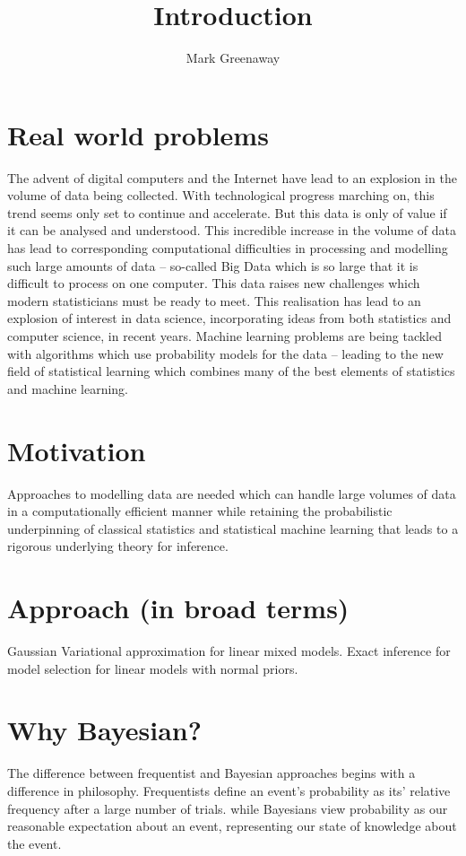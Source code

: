 \documentclass{amsart}[12pt]
\title{Introduction}
\author{Mark Greenaway}
\begin{document}
\setlength{\parindent}{0pt}
\maketitle

\section{Real world problems}
The advent of digital computers and the Internet have lead to an explosion in the volume of data being
collected. With technological progress marching on, this trend seems only set to continue and accelerate. But
this data is only of value if it can be analysed and understood.  This incredible increase in the volume of
data has lead to corresponding computational difficulties in processing and modelling such large amounts of
data -- so-called Big Data which is so large that it is difficult to process on one computer. This data raises
new challenges which modern statisticians must be ready to meet. This realisation has lead to an explosion of
interest in data science, incorporating ideas from both statistics and computer science, in recent years.
Machine learning problems are being tackled with algorithms which use probability models for the data --
leading to the new field of statistical learning which combines many of the best elements of statistics and
machine  learning.
\citep{James:2014:ISL:2517747}
\citep{MacKay:2002:ITI:971143}
\citep{hastie01statisticallearning}
\citep{Murphy:2012:MLP:2380985}

\section{Motivation}
Approaches to modelling data are needed which can handle large volumes of data in a computationally
efficient manner while retaining the probabilistic underpinning of classical statistics and statistical machine
learning that leads to a rigorous underlying theory for inference.

\section{Approach (in broad terms)}
Gaussian Variational approximation for linear mixed models.
Exact inference for model selection for linear models with normal priors.

\section{Why Bayesian?}
The difference between frequentist and Bayesian approaches begins with a difference in philosophy.
Frequentists define an event's probability as its' relative frequency after a large number of trials.
while Bayesians view probability as our reasonable expectation about an event, representing our state of knowledge about the event.
\end{document}
